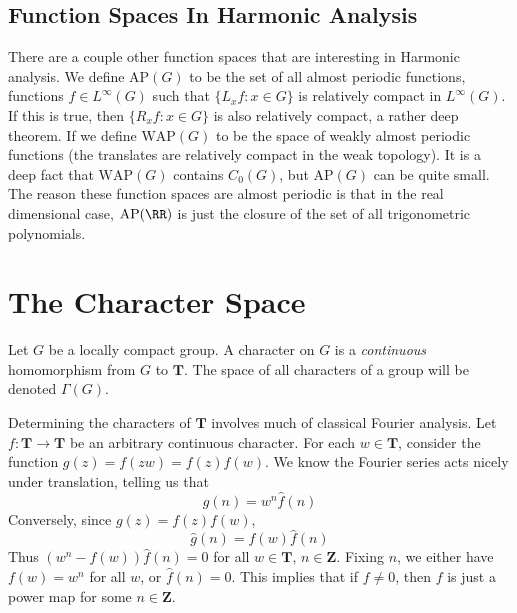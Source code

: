\section{Function Spaces In Harmonic Analysis}

There are a couple other function spaces that are interesting in Harmonic analysis. We define $\text{AP}(G)$ to be the set of all almost periodic functions, functions $f \in L^\infty(G)$ such that $\{ L_x f : x \in G \}$ is relatively compact in $L^\infty(G)$. If this is true, then $\{ R_x f : x \in G \}$ is also relatively compact, a rather deep theorem. If we define $\text{WAP}(G)$ to be the space of weakly almost periodic functions (the translates are relatively compact in the weak topology). It is a deep fact that $\text{WAP}(G)$ contains $C_0(G)$, but $\text{AP}(G)$ can be quite small. The reason these function spaces are almost periodic is that in the real dimensional case, $\text{AP}(\RR)$ is just the closure of the set of all trigonometric polynomials.

\chapter{The Character Space}

Let $G$ be a locally compact group. A character on $G$ is a {\it continuous} homomorphism from $G$ to $\mathbf{T}$. The space of all characters of a group will be denoted $\Gamma(G)$.

\begin{example}
    Determining the characters of $\mathbf{T}$ involves much of classical Fourier analysis. Let $f: \mathbf{T} \to \mathbf{T}$ be an arbitrary continuous character. For each $w \in \mathbf{T}$, consider the function $g(z) = f(zw) = f(z)f(w)$. We know the Fourier series acts nicely under translation, telling us that
    \[ \hat{g}(n) = w^n \hat{f}(n) \]
    Conversely, since $g(z) = f(z)f(w)$,
    \[ \hat{g}(n) = f(w) \hat{f}(n) \]
    Thus $(w^n - f(w)) \hat{f}(n) = 0$ for all $w \in \mathbf{T}$, $n \in \mathbf{Z}$. Fixing $n$, we either have $f(w) = w^n$ for all $w$, or $\hat{f}(n) = 0$. This implies that if $f \neq 0$, then $f$ is just a power map for some $n \in \mathbf{Z}$.
\end{example}

